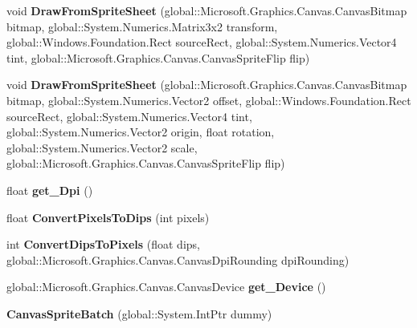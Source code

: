 \begin{DoxyCompactItemize}
void {\bfseries Draw\+From\+Sprite\+Sheet} (global\+::\+Microsoft.\+Graphics.\+Canvas.\+Canvas\+Bitmap bitmap, global\+::\+System.\+Numerics.\+Matrix3x2 transform, global\+::\+Windows.\+Foundation.\+Rect source\+Rect, global\+::\+System.\+Numerics.\+Vector4 tint, global\+::\+Microsoft.\+Graphics.\+Canvas.\+Canvas\+Sprite\+Flip flip)
\item 
\mbox{\label{class_microsoft_1_1_graphics_1_1_canvas_1_1_canvas_sprite_batch_adf9c3f59de40a640884b277dc8f5f51e}} 
void {\bfseries Draw\+From\+Sprite\+Sheet} (global\+::\+Microsoft.\+Graphics.\+Canvas.\+Canvas\+Bitmap bitmap, global\+::\+System.\+Numerics.\+Vector2 offset, global\+::\+Windows.\+Foundation.\+Rect source\+Rect, global\+::\+System.\+Numerics.\+Vector4 tint, global\+::\+System.\+Numerics.\+Vector2 origin, float rotation, global\+::\+System.\+Numerics.\+Vector2 scale, global\+::\+Microsoft.\+Graphics.\+Canvas.\+Canvas\+Sprite\+Flip flip)
\item 
\mbox{\label{class_microsoft_1_1_graphics_1_1_canvas_1_1_canvas_sprite_batch_ac7c3fcb4f10743d465779d1001600913}} 
float {\bfseries get\+\_\+\+Dpi} ()
\item 
\mbox{\label{class_microsoft_1_1_graphics_1_1_canvas_1_1_canvas_sprite_batch_a892b10eda90f5263ebc1628954d0baf9}} 
float {\bfseries Convert\+Pixels\+To\+Dips} (int pixels)
\item 
\mbox{\label{class_microsoft_1_1_graphics_1_1_canvas_1_1_canvas_sprite_batch_ad29355a30ec2c41afbec5c8728561010}} 
int {\bfseries Convert\+Dips\+To\+Pixels} (float dips, global\+::\+Microsoft.\+Graphics.\+Canvas.\+Canvas\+Dpi\+Rounding dpi\+Rounding)
\item 
\mbox{\label{class_microsoft_1_1_graphics_1_1_canvas_1_1_canvas_sprite_batch_a6a382f246e096c28933db88bf3b579f7}} 
global\+::\+Microsoft.\+Graphics.\+Canvas.\+Canvas\+Device {\bfseries get\+\_\+\+Device} ()
\item 
\mbox{\label{class_microsoft_1_1_graphics_1_1_canvas_1_1_canvas_sprite_batch_a81340af827697e7a6d22bf42fc032c21}} 
{\bfseries Canvas\+Sprite\+Batch} (global\+::\+System.\+Int\+Ptr dummy)
\end{DoxyCompactItemize}
